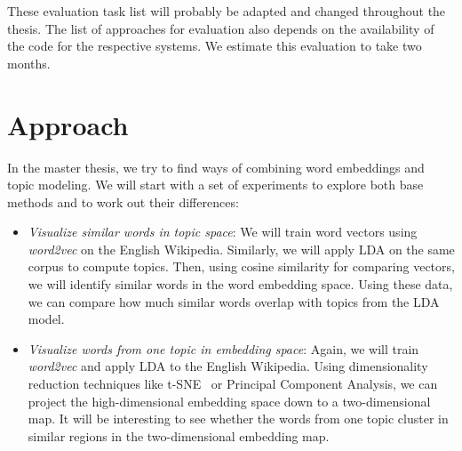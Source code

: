\documentclass{sig-alternate-05-2015}
\begin{document}
\begin{itemize}

\end{itemize}
These evaluation task list will probably be adapted and changed throughout the thesis.
The list of approaches for evaluation also depends on the availability of the code for the respective systems.
We estimate this evaluation to take two months.

\section{Approach}
\label{sec:approach}

In the master thesis, we try to find ways of combining word embeddings and topic modeling.
We will start with a set of experiments to explore both base methods and to work out their differences:
\begin{itemize}
       \item
              \emph{Visualize similar words in topic space}:
              We will train word vectors using \emph{word2vec} on the English Wikipedia.
              Similarly, we will apply LDA on the same corpus to compute topics.
              Then, using cosine similarity for comparing vectors, we will identify similar words in the word embedding space.
              Using these data, we can compare how much similar words overlap with topics from the LDA model.
       \item
              \emph{Visualize words from one topic in embedding space}:
              Again, we will train \emph{word2vec} and apply LDA to the English Wikipedia.
              Using dimensionality reduction techniques like t-SNE~\cite{VanDerMaaten2008} or Principal Component Analysis, we can project the high-dimensional embedding space down to a two-dimensional map.
              It will be interesting to see whether the words from one topic cluster in similar regions in the two-dimensional embedding map.
\end{itemize}
\end{document}
